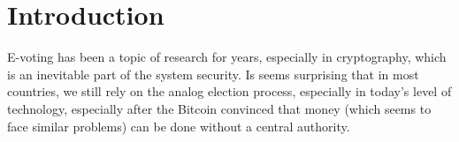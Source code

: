\documentclass[runningheads]{llncs}
\begin{document}
\begin{abstract}



 
\end{abstract}


\section{Introduction}
E-voting has been a topic of research for years, especially in cryptography, which is an inevitable part of the system security. Is seems surprising that in most countries, we still rely on the analog election process, especially in today's level of technology, especially after the Bitcoin convinced that money (which seems to face similar problems) can be done without a central authority. 


\end{document}
